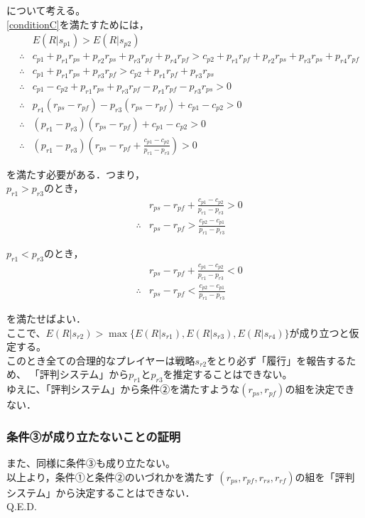 について考える。\\

\eqref{conditionC}を満たすためには，
\begin{eqnarray*}
  &&E(R |s_{p1}) > E(R |s_{p2}) \\
  &\therefore& c_{p1} + p_{r1} r_{ps} + p_{r2} r_{ps} + p_{r3} r_{pf} + p_{r4} r_{pf} > c_{p2} + p_{r1} r_{pf} + p_{r2} r_{ps} + p_{r3} r_{ps} + p_{r4} r_{pf} \\
  &\therefore& c_{p1} + p_{r1} r_{ps} + p_{r3} r_{pf} > c_{p2} + p_{r1} r_{pf} + p_{r3} r_{ps} \\
  &\therefore& c_{p1} - c_{p2} + p_{r1} r_{ps} + p_{r3} r_{pf} - p_{r1} r_{pf} - p_{r3} r_{ps} > 0 \\
  &\therefore& p_{r1}(r_{ps} - r_{pf}) - p_{r3}(r_{ps} - r_{pf}) + c_{p1} - c_{p2} > 0 \\
  &\therefore& (p_{r1} - p_{r3})(r_{ps} - r_{pf}) + c_{p1} - c_{p2} > 0 \\
  &\therefore& (p_{r1} - p_{r3})(r_{ps} - r_{pf} + \frac{ c_{p1} - c_{p2} }{p_{r1} - p_{r3}}) > 0
\end{eqnarray*}

を満たす必要がある．つまり，\\

$p_{r1} > p_{r3}$のとき， 
\begin{eqnarray}
  &&r_{ps} - r_{pf} + \frac{ c_{p1} - c_{p2} }{p_{r1} - p_{r3}} > 0\nonumber \\
  &\therefore&r_{ps} - r_{pf} > \frac{ c_{p2} - c_{p1} }{ p_{r1} - p_{r3} } \nonumber
\end{eqnarray}

$p_{r1} < p_{r3}$のとき， 
\begin{eqnarray}
  &&r_{ps} - r_{pf} + \frac{ c_{p1} - c_{p2} }{p_{r1} - p_{r3}} < 0 \nonumber \\
  &\therefore&r_{ps} - r_{pf} < \frac{ c_{p2} - c_{p1} }{ p_{r1} - p_{r3} } \nonumber
\end{eqnarray}

を満たせばよい．\\

ここで、$E(R|s_{r2})>\max\{E(R|s_{r1}), E(R|s_{r3}), E(R|s_{r4}) \}$が成り立つと仮定する。\\

このとき全ての合理的なプレイヤーは戦略$s_{r2}$をとり必ず「履行」を報告するため、
「評判システム」から$p_{r1}$と$p_{r3}$を推定することはできない。\\

ゆえに、「評判システム」から条件②を満たすような$(r_{ps}, r_{pf})$の組を決定できない．\\

\subsubsection{条件③が成り立たないことの証明}
また、同様に条件③も成り立たない。\\

以上より，条件①と条件②のいづれかを満たす
$(r_{ps}, r_{pf},r_{rs},r_{rf})$の組を「評判システム」から決定することはできない．\\

Q.E.D. \\